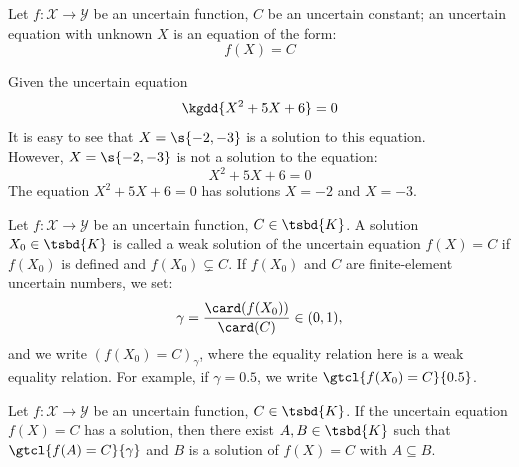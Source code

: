 \begin{definition}
	Let $f : \mathcal{X}\to \mathcal{Y}$ be an uncertain function, $C$ be an uncertain constant; an uncertain equation with unknown $X$ is an equation of the form: \[f(X) = C\]
\end{definition}
\begin{example}
	Given the uncertain equation \[\kgdd{X^2+5X+6} = 0 \]
	It is easy to see that $X = \s{-2,-3}$ is a solution to this equation. \\
	However, $X = \s{-2,-3}$ is not a solution to the equation:
	\[X^2+5X+6 = 0 \]
	The equation $X^2+5X+6 = 0$ has solutions $X=-2$ and $X=-3$.
\end{example}
\begin{definition}
	Let $f : \mathcal{X} \to \mathcal{Y}$ be an uncertain function, $C \in \tsbd{K}$. 
	A solution $X_0 \in \tsbd{K}$ is called a weak solution of the uncertain equation $f(X) = C$ if $f(X_0)$ is defined and $f(X_0) \subsetneq C$. If $f(X_0)$ and $C$ are finite-element uncertain numbers, we set: \[\gamma = \frac{\card(f(X_0))}{\card(C)} \in (0,1),\] and we write $(f(X_0) = C)_\gamma$, where the equality relation here is a weak equality relation. For example, if $\gamma = 0.5$, we write $\gtcl{f(X_0) = C}{0.5}$.
\end{definition}
\begin{theorem}
	Let $f : \mathcal{X} \to \mathcal{Y}$ be an uncertain function, $C \in \tsbd{K}$. If the uncertain equation $f(X) = C$ has a solution, then there exist $A,B \in \tsbd{K}$ such that $\gtcl{f(A) = C}{\gamma}$ and $B$ is a solution of $f(X)=C$ with $A \subseteq B$.
\end{theorem}
